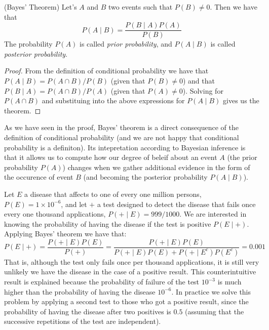 \begin{theorem} (Bayes' Theorem) Let's $A$ and $B$ two events such that $P\left( B \right) \neq 0$. Then we have that
\[
P \left( A \mid B \right) = \frac{P \left( B \mid A \right) P \left( A \right)}{P \left( B \right)}
\]
The probability $P\left( A \right)$ is called \emph{prior probability}, and $P\left( A \mid B \right)$ is called \emph{posterior probability}.
\end{theorem}
\begin{proof}
From the definition of conditional probability we have that $P \left( A \mid B \right) = P \left( A \cap B \right) / P \left( B \right)$ (given that $P \left( B \right) \neq 0$) and that $P \left( B \mid A \right) = P \left( A \cap B \right) / P \left( A \right)$ (given that $P \left( A \right) \neq 0$). Solving for $P(A\cap B)$ and substituing into the above expressions for $P(A\mid B)$ gives us the theorem.
\end{proof}

As we have seen in the proof, Bayes' theorem is a direct consequence of the definition of conditional probability (and we are not happy that conditional probability is a definiton). Its intepretation according to Bayesian inference is that it allows us to compute how our degree of beleif about an event $A$ (the prior probability $P\left( A \right)$) changes when we gather additional evidence in the form of the occurence of event $B$ (and becoming the posterior probability $P\left( A \mid B \right)$).

\begin{example}
Let $E$ a disease that affects to one of every one million persons, $P(E) = 1 \times 10^{-6}$, and let $+$ a test designed to detect the disease that fails once every one thousand applications, $P(+ \mid E) = 999/1000$. We are interested in knowing the probability of having the disease if the test is positive $P(E \mid +)$. Applying Bayes' theorem we have that:
\[
P(E \mid +) = \frac{P(+ \mid E) P(E)}{P(+)} = \frac{P(+ \mid E) P(E)}{P(+ \mid E) P(E) + P(+ \mid E^c) P(E^c)} = 0.001
\]
That is, although the test only fails once per thousand applications, it is still very unlikely we have the disease in the case of a positive result. This counterintuitive result is explained because the probability of failure of the test $10^{-3}$ is much higher than the probability of having the disease $10^{-6}$. In practice we solve this problem by applying a second test to those who got a positive result, since the probability of having the disease after two positives is $0.5$ (assuming that the successive repetitions of the test are independent).
\end{example}

